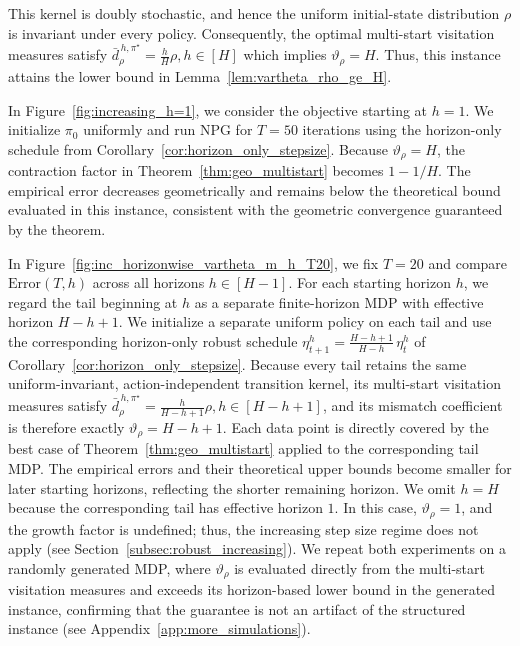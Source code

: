 \documentclass[11pt]{article}
\begin{document}
This kernel is doubly stochastic, and hence the uniform initial-state
distribution $\rho$ is invariant under every policy. Consequently, the
optimal multi-start visitation measures satisfy $\bar d^{\,h,\pi^\star}_\rho
=
\frac{h}{H}\rho, h\in[H]$ which implies $\vartheta_\rho=H$. Thus, this instance attains the lower
bound in Lemma~\ref{lem:vartheta_rho_ge_H}.

In Figure~\ref{fig:increasing_h=1}, we consider the objective starting at
$h=1$. We initialize $\pi_0$ uniformly and run NPG for $T=50$ iterations
using the horizon-only schedule from
Corollary~\ref{cor:horizon_only_stepsize}. Because $\vartheta_\rho=H$, the contraction factor in
Theorem~\ref{thm:geo_multistart} becomes $1-1/H$. The empirical error
decreases geometrically and remains below the theoretical bound
evaluated in this instance, consistent with the geometric convergence
guaranteed by the theorem.


In Figure~\ref{fig:inc_horizonwise_vartheta_m_h_T20}, we fix $T=20$ and compare $\text{Error}(T,h)$ across all horizons $h\in[H-1]$. For each starting horizon
$h$, we regard the tail beginning at $h$ as a separate finite-horizon MDP
with effective horizon $H-h+1$. We initialize a separate uniform policy on each tail and use the
corresponding horizon-only robust schedule $\eta^{h}_{t+1}=\frac{H-h+1}{H-h}\,\eta^{h}_t$ of Corollary~\ref{cor:horizon_only_stepsize}. Because every tail retains the same uniform-invariant,
action-independent transition kernel, its multi-start visitation measures
satisfy $\bar d^{\,h,\pi^\star}_{\rho}=\frac{h}{H-h+1}\rho, h\in[H-h+1]$, and its mismatch coefficient is therefore exactly
$\vartheta_{\rho}=H-h+1$. Each data point is directly covered by the best case of Theorem~\ref{thm:geo_multistart} applied
to the corresponding tail MDP. The empirical errors and their theoretical upper bounds become
smaller for later starting horizons, reflecting the shorter remaining
horizon. We omit $h=H$ because the corresponding tail has effective horizon $1$. In this case,
$\vartheta_{\rho}=1$, and the growth factor is undefined;
thus, the increasing step size regime does not apply (see Section~\ref{subsec:robust_increasing}). We repeat both experiments on a
randomly generated MDP, where $\vartheta_\rho$ is evaluated directly from
the multi-start visitation measures and
exceeds its horizon-based lower bound in the generated instance, confirming
that the guarantee is not an artifact of the structured instance (see Appendix~\ref{app:more_simulations}).
\end{document}
